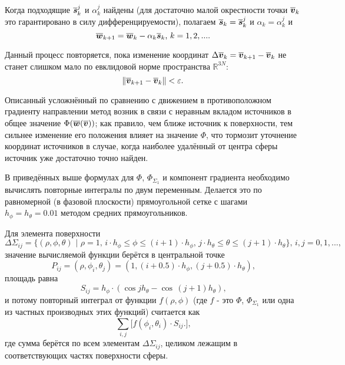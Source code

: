 Когда подходящие $\boldsymbol{\overline{s}}_k^j$ и $\alpha_k^j$ найдены (для достаточно малой окрестности точки $\boldsymbol{\overline{v}}_k$ это гарантировано в силу дифференцируемости), полагаем $\boldsymbol{\overline{s}}_k = \boldsymbol{\overline{s}}_k^j$ и $\alpha_k = \alpha_k^j$ и
\begin{equation}
\boldsymbol{\overline{w}}_{k+1} = \boldsymbol{\overline{w}}_{k} - \alpha_k \boldsymbol{\overline{s}}_k \text{, } k=1,2,... \text{.}
\end{equation}

Данный процесс повторяется, пока изменение координат $\Delta \boldsymbol{\overline{v}}_k = \boldsymbol{\overline{v}}_{k+1} - \boldsymbol{\overline{v}}_k$ не станет слишком мало по евклидовой норме пространства $\mathbb{R}^{3N}$:
\begin{equation}
\left\lVert \boldsymbol{\overline{v}}_{k+1} - \boldsymbol{\overline{v}}_{k} \right\lVert < \varepsilon \text{.}
\end{equation}

Описанный усложнённый по сравнению с движением в противоположном градиенту направлении метод возник в связи с неравным вкладом источников в общее значение $\Phi(\boldsymbol{\overline{w}}(\boldsymbol{\overline{v}}))$; как правило, чем ближе источник к поверхности, тем сильнее изменение его положения влияет на значение $\Phi$, что тормозит уточнение координат источников в случае, когда наиболее удалённый от центра сферы источник уже достаточно точно найден.

В приведённых выше формулах для $\Phi$, $\Phi_{\Sigma_1}$ и компонент градиента необходимо вычислять повторные интегралы по двум переменным. Делается это по равномерной (в фазовой плоскости) прямоугольной сетке с шагами $h_\phi = h_\theta = 0.01$ методом средних прямоугольников.

Для элемента поверхности
\begin{equation}
    \Delta \Sigma_{ij} = \lbrace (\rho, \phi, \theta)
    \text{ | }
    \rho = 1,\,
    i \cdot h_\phi \le \phi \le (i + 1) \cdot h_\phi,\,
    j \cdot h_\theta \le \theta \le (j + 1) \cdot h_\theta
    \rbrace
    \text{, }
    i,j=0,1,...\text{,}
\end{equation}
значение вычисляемой функции берётся в центральной точке
\begin{equation}
    P_{ij} = (\rho, \phi_i, \theta_j) = (1, (i + 0.5) \cdot h_\phi, (j + 0.5) \cdot h_\theta) \text{,}
\end{equation}
площадь равна
\begin{equation}
    S_{ij} = h_\phi \cdot (\cos j h_\theta - \cos\, (j + 1) h_\theta) \text{,}
\end{equation}
и потому повторный интеграл от функции $f(\rho, \phi)$ (где $f$ - это $\Phi$, $\Phi_{\Sigma_1}$ или одна из частных производных этих функций) считается как
\begin{equation}
    \sum_{i, j}
    \big[
    f(\phi_i, \theta_i) \cdot S_{ij} \text{.}
    \big]
    \text{,}
\end{equation}
где сумма берётся по всем элементам $\Delta \Sigma_{ij}$, целиком лежащим в соответствующих частях поверхности сферы.